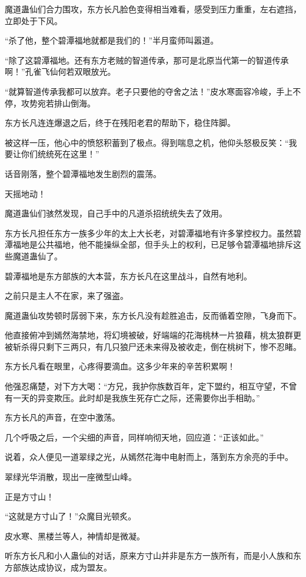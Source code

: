\begin{this_body}
魔道蛊仙们合力围攻，东方长凡脸色变得相当难看，感受到压力重重，左右遮挡，立即处于下风。

“杀了他，整个碧潭福地就都是我们的！”半月蛮师叫嚣道。

“除了这碧潭福地。还有东方老贼的智道传承，那可是北原当代第一的智道传承啊！”孔雀飞仙何若双眼放光。

“就算智道传承我都可以放弃。老子只要他的夺舍之法！”皮水寒面容冷峻，手上不停，攻势宛若排山倒海。

东方长凡连连爆退之后，终于在残阳老君的帮助下，稳住阵脚。

被这样一压，他心中的愤怒积蓄到了极点。得到喘息之机，他仰头怒极反笑：“我要让你们统统死在这里！”

话音刚落，整个碧潭福地发生剧烈的震荡。

天摇地动！

魔道蛊仙们骇然发现，自己手中的凡道杀招统统失去了效用。

东方长凡担任东方一族多少年的太上大长老，对碧潭福地有许多掌控权力。虽然碧潭福地是公共福地，他不能操纵全部，但手头上的权利，已足够令碧潭福地排斥这些魔道蛊仙了。

碧潭福地是东方部族的大本营，东方长凡在这里战斗，自然有地利。

之前只是主人不在家，来了强盗。

魔道蛊仙攻势顿时孱弱下来，东方长凡没有趁胜追击，反而循着空隙，飞身而下。

他直接俯冲到嫣然海禁地，将幻境被破，好端端的花海桃林一片狼藉，桃太狼群更被斩杀得只剩下三两只，有几只狼尸还未来得及被收走，倒在桃树下，惨不忍睹。

东方长凡看在眼里，心疼得要滴血。这多少年来的辛苦积累啊！

他强忍痛楚，对下方大喝：“方兄，我护你族数百年，定下盟约，相互守望，不曾有一天的异变欺压。此时却是我族生死存亡之际，还需要你出手相助。”

东方长凡的声音，在空中激荡。

几个呼吸之后，一个尖细的声音，同样响彻天地，回应道：“正该如此。”

说着，众人便见一道翠绿之光，从嫣然花海中电射而上，落到东方余亮的手中。

翠绿光华消散，现出一座微型山峰。

正是方寸山！

“这就是方寸山了！”众魔目光顿炙。

皮水寒、黑楼兰等人，神情却是微凝。

听东方长凡和小人蛊仙的对话，原来方寸山并非是东方一族所有，而是小人族和东方部族达成协议，成为盟友。


\end{this_body}

